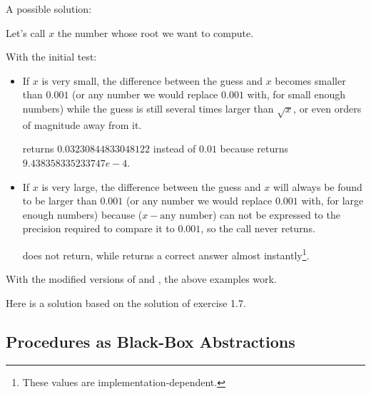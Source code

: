 \begin{exe}[1.7]
    A possible solution:

    Let's call $x$ the number whose root we want to compute.

    With the initial  test:
    \begin{itemize}
        \item If $x$ is very small, the difference between the guess and $x$ 
        becomes smaller than $0.001$ (or any number we would replace $0.001$ 
        with, for small enough numbers) while the guess is still several times 
        larger than $\sqrt{x}$, or even orders of magnitude away from it.
        \begin{example}
             returns $0.03230844833048122$ instead of $0.01$ 
            because\linebreak
            returns\linebreak
            $9.438358335233747e-4$.
        \end{example}
    \item If $x$ is very large, the difference between the guess and $x$ will 
        always be found to be larger than $0.001$ (or any number we would 
        replace $0.001$ with, for large enough numbers) because
        ($x - \text{any number}$) can not be expressed to the precision required 
        to compare it to $0.001$, so the call never returns.
        \begin{example}
             does not return, while  
            returns a correct answer almost instantly\footnote{These values are 
            implementation-dependent.}.
        \end{example}
    \end{itemize}

    With the modified versions of  and , the 
    above examples work.
\end{exe}

\begin{exe}[1.8]
    Here is a solution based on the solution of exercise 1.7.
\end{exe}

\subsection{Procedures as Black-Box Abstractions}

